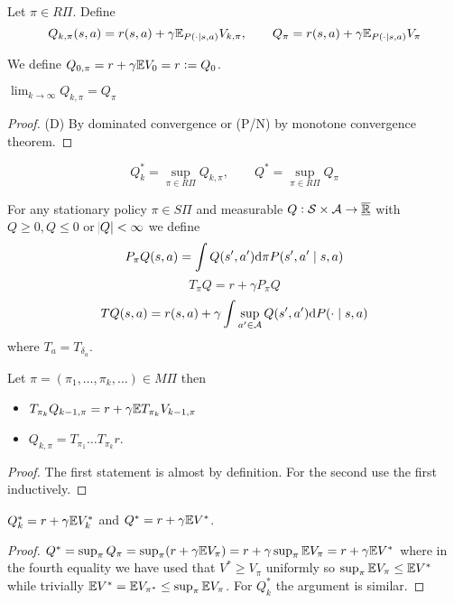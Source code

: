 \begin{defn}
  Let $\pi \in R\Pi$.
  Define
  \[ Q_{k, \pi}(s, a) = r(s, a) + \gamma \mathbb{E}_{P(\cdot \mid s, a)} V_{k, \pi}
  ,\qquad Q_\pi = r(s, a) + \gamma \mathbb{E}_{P(\cdot \mid s, a)} V_\pi \]
\end{defn}
We define $Q_{0,\pi} = r + \gamma \mathbb{E} V_0 = r \vcentcolon= Q_0$.


\begin{prop}
  $\lim_{k \to \infty} Q_{k, \pi} = Q_\pi$
  \label{prop:QpiConverges}
\end{prop}
\begin{proof}
  (D) By dominated convergence or (P/N) by monotone convergence theorem.
\end{proof}

\begin{defn}
  \[ Q^*_k = \sup_{\pi \in R\Pi} Q_{k, \pi}
  , \qquad Q^* = \sup_{\pi \in R\Pi} Q_\pi \]
\end{defn}

\begin{defn}
  For any stationary policy $\pi \in S\Pi$
  and measurable $Q:\mathcal{S} \times \mathcal{A} \to \overline{\underline{\mathbb{R}}}$ with
  $Q \geq 0, Q \leq 0$ or $\abs{Q} < \infty$ we define
  \[ P_\pi Q(s, a) = \int Q(s', a') \mathrm{d} \pi P(s', a' \mid s, a) \]
  \[ T_\pi Q = r + \gamma P_\pi Q \]
  \[ T Q(s, a) = r(s, a) + \gamma
  \int \sup_{a' \in \mathcal{A}} Q(s', a') \mathrm{d} P(\cdot \mid s, a) \]
  where $T_a = T_{\delta_a}$.
\end{defn}

\begin{prop} Let $\pi = (\pi_1, \dots, \pi_k, \dots) \in M\Pi$ then
  \begin{itemize}
    \item $T_{\pi_k} Q_{k-1, \pi}
      = r + \gamma \mathbb{E} T_{\pi_k} V_{k-1, \pi}$
    \item $Q_{k, \pi} = T_{\pi_1} \dots T_{\pi_k} r$.
  \end{itemize}
  \label{prop:QpiVpi}
\end{prop}
\begin{proof} %
  The first statement is almost by definition.
  For the second use the first inductively.
\end{proof}

\begin{prop}
  $Q^*_k = r + \gamma \mathbb{E} V^*_k$
  and $Q^* = r + \gamma \mathbb{E} V^*$.
  \label{prop:Q*V*}
\end{prop}
\begin{proof}
  $Q^* = \sup_\pi Q_\pi = \sup_\pi (r + \gamma \mathbb{E} V_\pi)
  = r + \gamma \sup_\pi \mathbb{E} V_\pi
  = r + \gamma \mathbb{E} V^*$
  where in the fourth equality we have used that
  $V^* \geq V_\pi$ uniformly so 
  $\sup_\pi \mathbb{E} V_\pi \leq \mathbb{E} V^*$
  while trivially $\mathbb{E} V^* = \mathbb{E} V_{\pi^*} \leq \sup_\pi \mathbb{E} V_\pi$.
  For $Q_k^*$ the argument is similar.
\end{proof}

